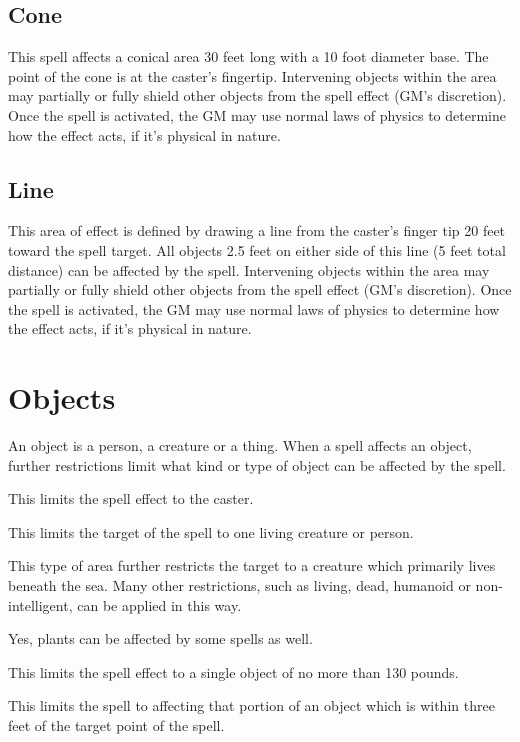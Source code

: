 \begin{multicols*}{2}
\subsection{Cone}
 This spell affects a conical area 30 feet long with a 10 foot diameter base. The point of the cone is at the caster's fingertip. Intervening objects within the area may partially or fully shield other objects from the spell effect (GM's discretion). Once the spell is activated, the GM may use normal laws of physics to determine how the effect acts, if it's physical in nature.
\subsection{Line}
 This area of effect is defined by drawing a line from the caster's finger tip 20 feet toward the spell target. All objects 2.5 feet on either side of this line (5 feet total distance) can be affected by the spell. Intervening objects within the area may partially or fully shield other objects from the spell effect (GM's discretion). Once the spell is activated, the GM may use normal laws of physics to determine how the effect acts, if it's physical in nature.
\section{Objects}
An object is a person, a creature or a thing. When a spell affects an object, further restrictions limit what kind or type of object can be affected by the spell.

 This limits the spell effect to the caster.

 This limits the target of the spell to one living creature or person.

 This type of area further restricts the target to a creature which primarily lives beneath the sea. Many other restrictions, such as living, dead, humanoid or non-intelligent, can be applied in this way.

 Yes, plants can be affected by some spells as well.

 This limits the spell effect to a single object of no more than 130 pounds.

 This limits the spell to affecting that portion of an object which is within three feet of the target point of the spell.


\end{multicols*}
